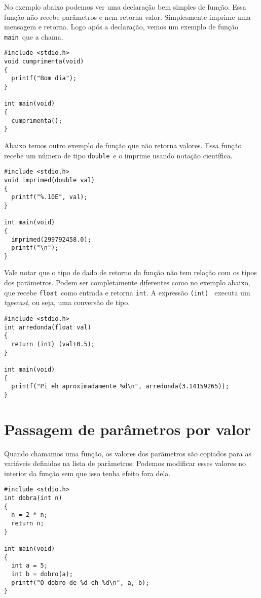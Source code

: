 \documentclass{book}
\newcommand{\INT}{{\tt int}}
\newcommand{\FLOAT}{{\tt float}}
\newcommand{\DOUBLE}{{\tt double}}
\newcommand{\MAIN}{{\tt main}}
\begin{document}
No exemplo abaixo podemos ver uma declaração bem simples de função. Essa função não recebe parâmetros e nem retorna valor. Simplesmente imprime uma mensagem e retorna. Logo após a declaração, vemos um exemplo de função \MAIN\ que a chama.

\begin{lstlisting}
#include <stdio.h>
void cumprimenta(void)
{
  printf("Bom dia");
}

int main(void)
{
  cumprimenta();
}
\end{lstlisting}

Abaixo temos outro exemplo de função que não retorna valores. Essa função recebe um número de tipo \DOUBLE\ e o imprime usando notação científica.

\begin{lstlisting}
#include <stdio.h>
void imprimed(double val)
{
  printf("%.10E", val);
}

int main(void)
{
  imprimed(299792458.0);
  printf("\n");
}
\end{lstlisting}

Vale notar que o tipo de dado de retorno da função não tem relação com os tipos dos parãmetros. Podem ser completamente diferentes como no exemplo abaixo, que recebe \FLOAT\ como entrada e retorna \INT. A expressão {\tt (int) } executa um {\it typecast}, ou seja, uma conversão de tipo. 

\begin{lstlisting}
#include <stdio.h>
int arredonda(float val)
{
  return (int) (val+0.5);
}

int main(void)
{
  printf("Pi eh aproximadamente %d\n", arredonda(3.14159265));
}
\end{lstlisting}


\section{Passagem de parâmetros por valor}

Quando chamamos uma função, os valores dos parãmetros são copiados para as variáveis definidas na lista de parâmetros. Podemos modificar esses valores no interior da função sem que isso tenha efeito fora dela.

\begin{lstlisting}
#include <stdio.h>
int dobra(int n)
{
  n = 2 * n;
  return n;
}

int main(void)
{
  int a = 5;
  int b = dobro(a);
  printf("O dobro de %d eh %d\n", a, b);
}
\end{lstlisting}
\end{document}

